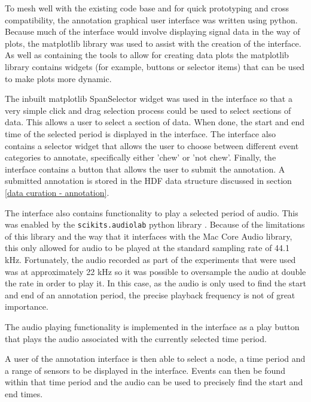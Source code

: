 To mesh well with the existing code base and for quick prototyping and cross compatibility, the annotation graphical user interface was written using python. Because much of the interface would involve displaying signal data in the way of plots, the matplotlib library was used to assist with the creation of the interface. As well as containing the tools to allow for creating data plots the matplotlib library contains widgets (for example, buttons or selector items) that can be used to make plots more dynamic. 

The inbuilt matplotlib SpanSelector widget was used in the interface so that a very simple click and drag selection process could be used to select sections of data. This allows a user to select a section of data. When done, the start and end time of the selected period is displayed in the interface. The interface also contains a selector widget that allows the user to choose between different event categories to annotate, specifically either 'chew' or 'not chew'. Finally, the interface contains a button that allows the user to submit the annotation. A submitted annotation is stored in the HDF data structure discussed in section \ref{data curation - annotation}. 

The interface also contains functionality to play a selected period of audio. This was enabled by the \texttt{scikits.audiolab} python library \cite{Cournapeau}. Because of the limitations of this library and the way that it interfaces with the Mac Core Audio library, this only allowed for audio to be played at the standard sampling rate of 44.1 kHz. Fortunately, the audio recorded as part of the experiments that were used was at approximately 22 kHz so it was possible to oversample the audio at double the rate in order to play it. In this case, as the audio is only used to find the start and end of an annotation period, the precise playback frequency is not of great importance. 

The audio playing functionality is implemented in the interface as a play button that plays the audio associated with the currently selected time period.  

A user of the annotation interface is then able to select a node, a time period and a range of sensors to be displayed in the interface. Events can then be found within that time period and the audio can be used to precisely find the start and end times. 


